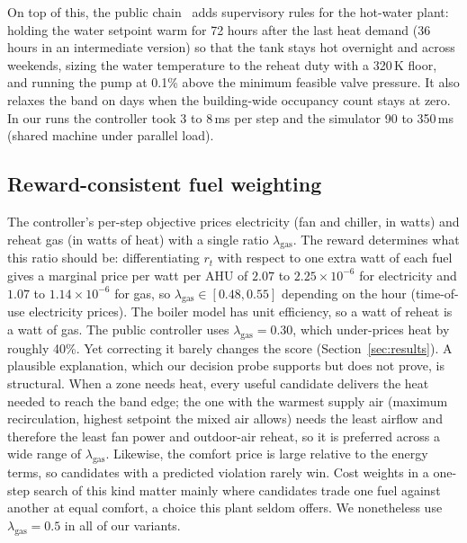 \documentclass{article}
\begin{document}
On top of this, the public chain~\citep{penguin2026} adds supervisory rules for the hot-water plant: holding the water setpoint warm for 72 hours after the last heat demand (36 hours in an intermediate version) so that the tank stays hot overnight and across weekends, sizing the water temperature to the reheat duty with a 320\,K floor, and running the pump at 0.1\% above the minimum feasible valve pressure. It also relaxes the band on days when the building-wide occupancy count stays at zero. In our runs the controller took 3 to 8\,ms per step and the simulator 90 to 350\,ms (shared machine under parallel load).

\subsection{Reward-consistent fuel weighting}
The controller's per-step objective prices electricity (fan and chiller, in watts) and reheat gas (in watts of heat) with a single ratio $\lambda_{\mathrm{gas}}$. The reward determines what this ratio should be: differentiating $r_t$ with respect to one extra watt of each fuel gives a marginal price per watt per AHU of $2.07$ to $2.25\times10^{-6}$ for electricity and $1.07$ to $1.14\times10^{-6}$ for gas, so $\lambda_{\mathrm{gas}} \in [0.48, 0.55]$ depending on the hour (time-of-use electricity prices). The boiler model has unit efficiency, so a watt of reheat is a watt of gas. The public controller uses $\lambda_{\mathrm{gas}} = 0.30$, which under-prices heat by roughly 40\%. Yet correcting it barely changes the score (Section~\ref{sec:results}). A plausible explanation, which our decision probe supports but does not prove, is structural. When a zone needs heat, every useful candidate delivers the heat needed to reach the band edge; the one with the warmest supply air (maximum recirculation, highest setpoint the mixed air allows) needs the least airflow and therefore the least fan power and outdoor-air reheat, so it is preferred across a wide range of $\lambda_{\mathrm{gas}}$. Likewise, the comfort price is large relative to the energy terms, so candidates with a predicted violation rarely win. Cost weights in a one-step search of this kind matter mainly where candidates trade one fuel against another at equal comfort, a choice this plant seldom offers. We nonetheless use $\lambda_{\mathrm{gas}}=0.5$ in all of our variants.
\end{document}
